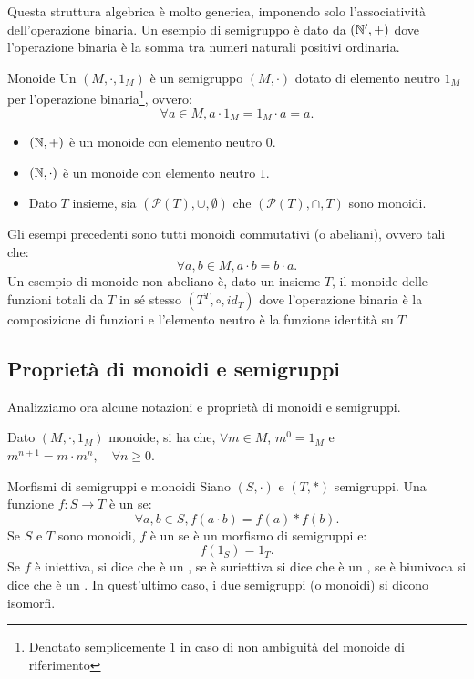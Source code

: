 Questa struttura algebrica è molto generica, imponendo solo l'associatività dell'operazione binaria.
Un esempio di semigruppo è dato da \((\mathbb{N}',+)\) dove l'operazione binaria è la somma tra numeri naturali positivi ordinaria.

\begin{definition}{Monoide}
  Un  \((M,\cdot,1_M)\) è un semigruppo \((M, \cdot)\) dotato di elemento neutro \(1_M\) per l'operazione binaria\footnote{Denotato semplicemente \(1\) in caso di non ambiguità del monoide di riferimento}, ovvero:
  \[\forall a \in M, a \cdot 1_M = 1_M \cdot a = a.\]
\end{definition}

\begin{example}{}
  \begin{itemize}
    \item \((\mathbb{N}, +)\) è un monoide con elemento neutro \(0\).
    \item \((\mathbb{N}, \cdot)\) è un monoide con elemento neutro \(1\).
    \item Dato \(T\) insieme, sia \((\mathcal{P}(T), \cup, \emptyset)\) che \((\mathcal{P}(T), \cap, T)\) sono monoidi.
  \end{itemize}
  Gli esempi precedenti sono tutti monoidi commutativi (o abeliani), ovvero tali che:
  \[\forall a,b \in M, a \cdot b = b \cdot a.\]
  Un esempio di monoide non abeliano è, dato un insieme \(T\), il monoide delle funzioni totali da \(T\) in sé stesso \((T^{T}, \circ, id_T)\) dove l'operazione binaria è la composizione di funzioni e l'elemento neutro è la funzione identità su \(T\).
\end{example}

\subsection{Proprietà di monoidi e semigruppi}

Analizziamo ora alcune notazioni e proprietà di monoidi e semigruppi.

\begin{note}[label=note:power_notation]{}
  Dato \((M,\cdot,1_M)\) monoide, si ha che, \(\forall m \in M\), \(m^0 = 1_M\) e \(m^{n+1} = m \cdot m^n, \quad \forall n \geq 0\).
\end{note}

\begin{definition}{Morfismi di semigruppi e monoidi}
  Siano \((S,\cdot)\) e \((T,*)\) semigruppi.
  Una funzione \(f: S \to T\) è un  se:
  \[\forall a,b \in S, f(a \cdot b) = f(a) * f(b).\]
  Se \(S\) e \(T\) sono monoidi, \(f\) è un  se è un morfismo di semigruppi e:
  \[f(1_S) = 1_T.\]
  Se \(f\) è iniettiva, si dice che è un , se è suriettiva si dice che è un , se è biunivoca si dice che è un .
  In quest'ultimo caso, i due semigruppi (o monoidi) si dicono isomorfi.
\end{definition}

